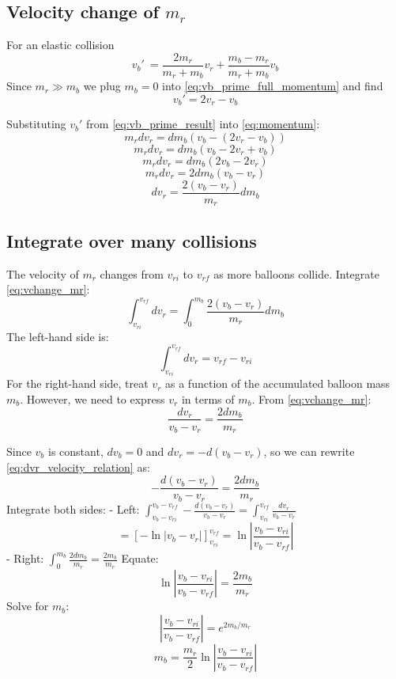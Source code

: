 \documentclass{article}
\begin{document}
\subsection[Velocity change of rocket mass]{Velocity change of \(m_r\)}
For an elastic collision
\begin{equation}
    v_b'\ = \frac{2m_r}{m_r+m_b}v_r + \frac{m_b-m_r}{m_r+m_b}v_b \label{eq:vb_prime_full_momentum}
\end{equation}
Since \(m_r \gg m_b\)   we plug \(m_b = 0\)  into \autoref{eq:vb_prime_full_momentum} and find 
\begin{equation}
v_b' = 2v_r - v_b  \label{eq:vb_prime_result}
\end{equation}      

Substituting \(v_b'\) from  \autoref{eq:vb_prime_result} into \autoref{eq:momentum}:
\[
m_r dv_r = dm_b (v_b - (2 v_r - v_b))
\]
\[
m_r dv_r = dm_b (v_b - 2 v_r + v_b)
\]
\[
m_r dv_r = dm_b (2 v_b - 2 v_r)
\]
\[
m_r dv_r = 2 dm_b (v_b - v_r)
\]
\begin{equation}
dv_r = \frac{2 (v_b - v_r)}{m_r} dm_b \label{eq:vchange_mr}
\end{equation}

\subsection{Integrate over many collisions}
The velocity of \( m_r \) changes from \( v_{ri} \) to \( v_{rf} \) as more balloons collide. Integrate \autoref{eq:vchange_mr}:
\[
\int_{v_{ri}}^{v_{rf}} dv_r = \int_0^{m_b} \frac{2 (v_b - v_r)}{m_r} dm_b
\]
The left-hand side is:
\[
\int_{v_{ri}}^{v_{rf}} dv_r = v_{rf} - v_{ri}
\]
For the right-hand side, treat \( v_r \) as a function of the accumulated balloon mass \( m_b \). However, we need to express \( v_r \) in terms of \( m_b \). From \autoref{eq:vchange_mr}:
\begin{equation}
\frac{dv_r}{v_b - v_r} = \frac{2 dm_b}{m_r}\label{eq:dvr_velocity_relation}
\end{equation}

Since \(v_b\) is constant,  \(dv_b = 0\) and  \(dv_r = -d(v_b-v_r)\), so we can rewrite \autoref{eq:dvr_velocity_relation} as:
\[
-\frac{d(v_b - v_r)}{v_b - v_r} = \frac{2 dm_b}{m_r}
\]
Integrate both sides:
- Left: \( \int_{v_b - v_{ri}}^{v_b - v_{rf}} -\frac{d(v_b - v_r)}{v_b - v_r} = \int_{v_{ri}}^{v_{rf}} \frac{dv_r}{v_b - v_r} \)
\[
= \left[ -\ln|v_b - v_r| \right]_{v_{ri}}^{v_{rf}} = \ln \left| \frac{v_b - v_{ri}}{v_b - v_{rf}} \right|
\]
- Right: \( \int_0^{m_b} \frac{2 dm_b}{m_r} = \frac{2 m_b}{m_r} \)
Equate:
\[
\ln \left| \frac{v_b - v_{ri}}{v_b - v_{rf}} \right| = \frac{2 m_b}{m_r}
\]
Solve for \( m_b \):
\[
\left| \frac{v_b - v_{ri}}{v_b - v_{rf}} \right| = e^{2 m_b / m_r}
\]
\begin{equation}
m_b = \frac{m_r}{2} \ln \left| \frac{v_b - v_{ri}}{v_b - v_{rf}} \right| 
\end{equation}
\end{document}
